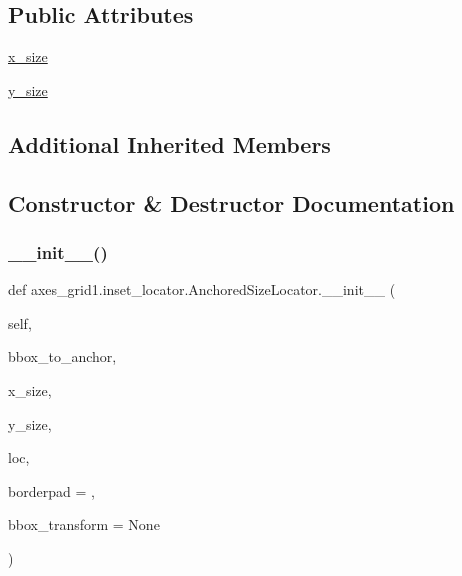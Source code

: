 \subsection*{Public Attributes}
\begin{DoxyCompactItemize}
\item 
\hyperlink{classaxes__grid1_1_1inset__locator_1_1AnchoredSizeLocator_a3c85d2dd55cbba8df63c31caa3b44553}{x\+\_\+size}
\item 
\hyperlink{classaxes__grid1_1_1inset__locator_1_1AnchoredSizeLocator_a812abebc75bf68d0723b6044b205acec}{y\+\_\+size}
\end{DoxyCompactItemize}
\subsection*{Additional Inherited Members}


\subsection{Constructor \& Destructor Documentation}
\mbox{\label{classaxes__grid1_1_1inset__locator_1_1AnchoredSizeLocator_acddd5729254bf66941df70c1ce90717a}} 
\subsubsection{\texorpdfstring{\+\_\+\+\_\+init\+\_\+\+\_\+()}{\_\_init\_\_()}}
{\footnotesize\ttfamily def axes\+\_\+grid1.\+inset\+\_\+locator.\+Anchored\+Size\+Locator.\+\_\+\+\_\+init\+\_\+\+\_\+ (\begin{DoxyParamCaption}\item[{}]{self,  }\item[{}]{bbox\+\_\+to\+\_\+anchor,  }\item[{}]{x\+\_\+size,  }\item[{}]{y\+\_\+size,  }\item[{}]{loc,  }\item[{}]{borderpad = {},  }\item[{}]{bbox\+\_\+transform = {\ttfamily None} }\end{DoxyParamCaption})}



